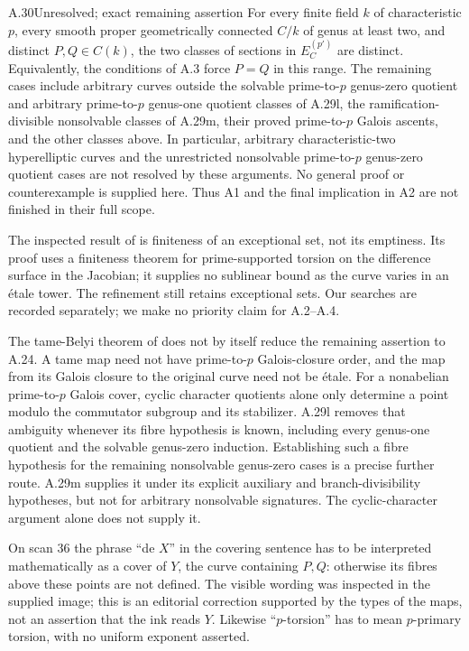 \begin{claim}{A.30}{Unresolved; exact remaining assertion}
For every finite field $k$ of characteristic $p$, every smooth proper
geometrically connected $C/k$ of genus at least two, and distinct
$P,Q\in C(k)$, the two classes of sections in $E_C^{(p')}$ are
distinct. Equivalently, the conditions of A.3 force $P=Q$ in this
range. The remaining cases include arbitrary curves outside the
solvable prime-to-$p$ genus-zero quotient and arbitrary
prime-to-$p$ genus-one quotient classes of A.29l, the
ramification-divisible nonsolvable classes of A.29m,
their proved prime-to-$p$ Galois ascents, and the other classes
above. In particular, arbitrary characteristic-two
hyperelliptic curves and the unrestricted nonsolvable
prime-to-$p$ genus-zero quotient cases are not resolved
by these arguments. No general proof or counterexample is
supplied here. Thus A1 and the final implication in A2 are not
finished in their full scope.
\end{claim}

The inspected result of \citet[Proposition 1.8(vi) and Corollary
1.11(iii)]{A_SaidiTamagawa2009} is finiteness of an exceptional set,
not its emptiness. Its proof uses a finiteness theorem for
prime-supported torsion on the difference surface in the Jacobian;
it supplies no sublinear bound as the curve varies in an \'etale
tower. The refinement \citep{A_SaidiTamagawa2017} still retains
exceptional sets. Our searches are recorded separately; we make
no priority claim for A.2--A.4.

The tame-Belyi theorem of \citet[Theorems 1.2 and
1.5]{A_KedlayaLittWitaszek2023} does not by itself reduce
the remaining assertion to A.24. A tame map need not have
prime-to-$p$ Galois-closure order, and the map from its
Galois closure to the original curve need not be \'etale.
For a nonabelian prime-to-$p$ Galois cover, cyclic
character quotients alone only determine a point modulo
the commutator subgroup and its stabilizer. A.29l removes
that ambiguity whenever its fibre hypothesis is known,
including every genus-one quotient and the solvable
genus-zero induction. Establishing such a fibre
hypothesis for the remaining nonsolvable genus-zero
cases is a precise further route. A.29m supplies it
under its explicit auxiliary and branch-divisibility
hypotheses, but not for arbitrary nonsolvable signatures.
The cyclic-character argument alone does not supply it.

On scan 36 the phrase ``de $X$'' in the covering sentence has to be
interpreted mathematically as a cover of $Y$, the curve containing
$P,Q$: otherwise its fibres above these points are not defined.
The visible wording was inspected in the supplied image; this is
an editorial correction supported by the types of the maps, not
an assertion that the ink reads $Y$. Likewise ``$p$-torsion'' has
to mean $p$-primary torsion, with no uniform exponent asserted.
